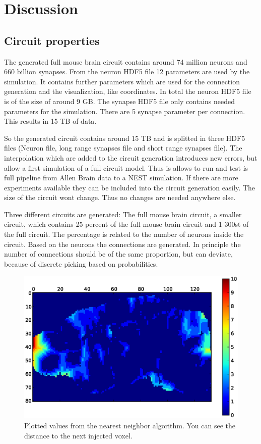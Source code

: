 %

\chapter{Discussion}

\section{Circuit properties}


The generated full mouse brain circuit contains around 74 million neurons and 660 billion synapses.
From the neuron HDF5 file 12 parameters are used by the simulation.
It contains further parameters which are used for the connection generation and the visualization,
like coordinates. In total the neuron HDF5 file is of the size of around 9 GB.
The synapse HDF5 file only contains needed parameters for the simulation.
There are 5 synapse parameter per connection. This results in 15 TB of data.

So the generated circuit contains around 15 TB and is splitted in three HDF5 files (Neuron file, long range synapses file and short range synapses file). The interpolation which are added to the circuit generation introduces new errors, but allow
a first simulation of a full circuit model. Thus is allows to run and test is full pipeline from Allen Brain data to a NEST simulation. If there are more experiments available they can be included into
the circuit generation easily. The size of the circuit wont change. Thus no changes are needed anywhere else.

Three different circuits are generated: The full mouse brain circuit,
a smaller circuit, which contains 25 percent of the full mouse brain circuit and
1 300st of the full circuit. The percentage is related to the number of neurons inside
the circuit. Based on the neurons the connections are generated. In principle the
number of connections should be of the same proportion, but can deviate, because of 
discrete picking based on probabilities.

\begin{figure}[ht!]
\centering
\includegraphics[scale=0.5]{pictures/distance_x_y_70.eps}
\caption{Plotted values from the nearest neighbor algorithm. You can see the distance to the next injected voxel.}
\end{figure}


